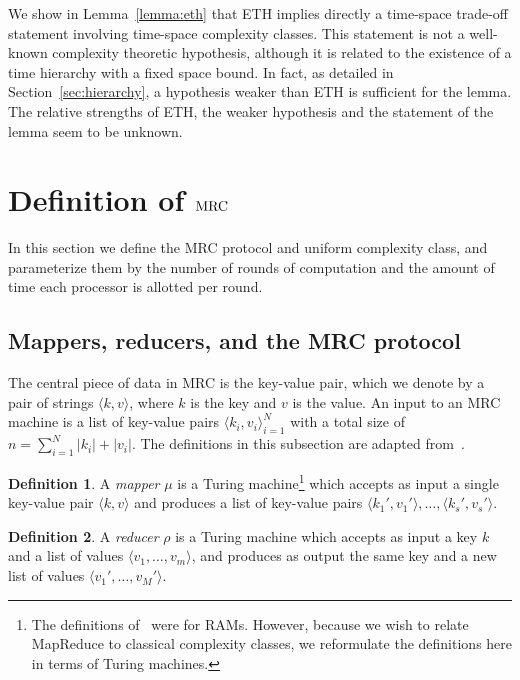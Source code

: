 \documentclass[letterpaper,USenglish]{lipics}
\theoremstyle{definition}
\newtheorem{defn}{Definition}
\theoremstyle{remark}
\newcommand{\mrc}{\textup{MRC}}
\begin{document}
We show in Lemma~\ref{lemma:eth} that ETH implies directly a time-space
trade-off statement involving time-space complexity classes. This statement is
not a well-known complexity theoretic hypothesis, although it is related to the
existence of a time hierarchy with a fixed space bound. In fact, as detailed in
Section~\ref{sec:hierarchy}, a hypothesis weaker than ETH is sufficient for the
lemma. The relative strengths of ETH, the weaker hypothesis and the statement
of the lemma seem to be unknown.

\section{Definition of $\mrc$} \label{sec:definition}

In this section we define the MRC protocol and uniform complexity class, and
parameterize them by the number of rounds of computation and the amount of time
each processor is allotted per round.

\subsection{Mappers, reducers, and the MRC protocol}

The central piece of data in MRC is the key-value pair, which we denote by a
pair of strings $\langle k, v \rangle$, where $k$ is the key and $v$ is the
value. An input to an MRC machine is a list of key-value pairs $\langle k_i,
v_i \rangle_{i=1}^N$ with a total size of $n = \sum_{i=1}^N |k_i| + |v_i|$.
The definitions in this subsection are adapted from~\cite{Karloff10}.

\begin{defn}
A \emph{mapper} $\mu$ is a Turing machine\footnote{The definitions
of~\cite{Karloff10} were for RAMs. However, because we wish to relate MapReduce
to classical complexity classes, we reformulate the definitions here in terms
of Turing machines.} which accepts as input a single key-value pair $\langle k,
v \rangle$ and produces a list of key-value pairs $\langle k_1', v_1' \rangle,
\dots, \langle k_s', v_s' \rangle$. \end{defn}

\begin{defn}
A \emph{reducer} $\rho$ is a Turing machine which accepts as input a key $k$
and a list of values $\langle v_1 , \dots, v_m \rangle$, and produces as output
the same key and a new list of values $\langle v_1', \dots, v_M' \rangle$.
\end{defn}
\end{document}

